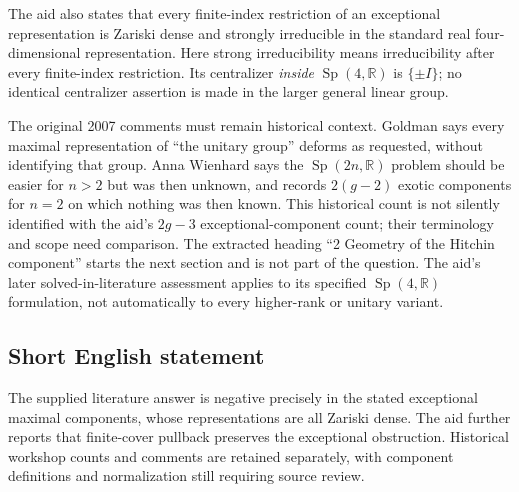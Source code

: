 \documentclass[11pt]{article}
\newcommand{\R}{\mathbb{R}}
\begin{document}
The aid also states that every finite-index restriction of an exceptional representation is Zariski dense and strongly irreducible in the standard real four-dimensional representation. Here strong irreducibility means irreducibility after every finite-index restriction. Its centralizer \emph{inside} \(\operatorname{Sp}(4,\R)\) is \(\{\pm I\}\); no identical centralizer assertion is made in the larger general linear group.

The original 2007 comments must remain historical context. Goldman says every maximal representation of ``the unitary group'' deforms as requested, without identifying that group. Anna Wienhard says the \(\operatorname{Sp}(2n,\R)\) problem should be easier for \(n>2\) but was then unknown, and records \(2(g-2)\) exotic components for \(n=2\) on which nothing was then known. This historical count is not silently identified with the aid's \(2g-3\) exceptional-component count; their terminology and scope need comparison. The extracted heading ``2 Geometry of the Hitchin component'' starts the next section and is not part of the question. The aid's later solved-in-literature assessment applies to its specified \(\operatorname{Sp}(4,\R)\) formulation, not automatically to every higher-rank or unitary variant.
\subsection{Short English statement}
The supplied literature answer is negative precisely in the stated exceptional maximal components, whose representations are all Zariski dense. The aid further reports that finite-cover pullback preserves the exceptional obstruction. Historical workshop counts and comments are retained separately, with component definitions and normalization still requiring source review.
\end{document}
